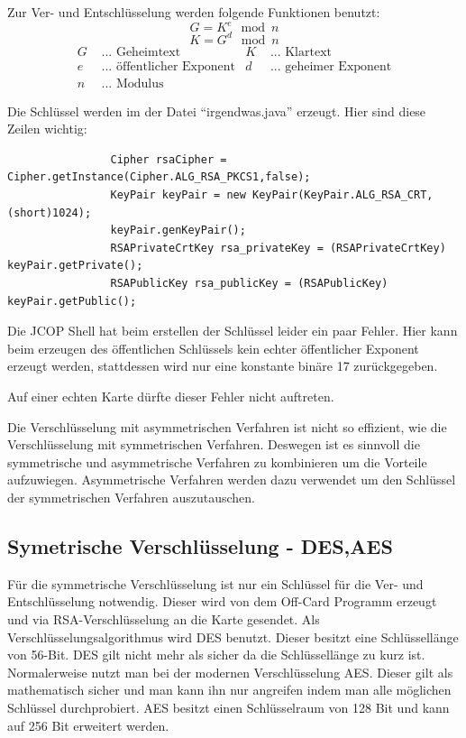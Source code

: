 \documentclass[parskip]{scrartcl}
\begin{document}
			Zur Ver- und Entschlüsselung werden folgende Funktionen benutzt:  
			 $$ G = K^{e}\mod{n} $$
			 $$ K = G^{d}\mod{n} $$
			 \begin{align*}
			  G & \text{ ... Geheimtext} & K & \text{ ... Klartext} \\
			  e & \text{ ... öffentlicher Exponent} & d & \text{ ... geheimer Exponent} \\
			  n & \text{ ... Modulus} & &
			 \end{align*}
			 
			Die Schlüssel werden im der Datei \enquote{irgendwas.java} erzeugt. Hier sind diese Zeilen wichtig:
			\label{RSAKeyPair}
			\begin{lstlisting}
				Cipher rsaCipher = Cipher.getInstance(Cipher.ALG_RSA_PKCS1,false);
				KeyPair keyPair = new KeyPair(KeyPair.ALG_RSA_CRT, (short)1024);
				keyPair.genKeyPair();
				RSAPrivateCrtKey rsa_privateKey = (RSAPrivateCrtKey) keyPair.getPrivate();
				RSAPublicKey rsa_publicKey = (RSAPublicKey) keyPair.getPublic();
			\end{lstlisting}
			Die JCOP Shell hat beim erstellen der Schlüssel leider ein paar Fehler. Hier kann beim erzeugen des öffentlichen Schlüssels kein echter öffentlicher Exponent erzeugt werden, stattdessen wird nur eine konstante binäre 17 zurückgegeben.
		
			Auf einer echten Karte dürfte dieser Fehler nicht auftreten.
		
			Die Verschlüsselung mit asymmetrischen Verfahren ist nicht so effizient, wie die Verschlüsselung mit symmetrischen Verfahren. Deswegen ist es sinnvoll die symmetrische und asymmetrische Verfahren zu kombinieren um die Vorteile aufzuwiegen. Asymmetrische Verfahren werden dazu verwendet um den Schlüssel der symmetrischen Verfahren auszutauschen.
	
		\subsection{Symetrische Verschlüsselung - DES,AES}
			Für die symmetrische Verschlüsselung ist nur ein Schlüssel für die Ver- und Entschlüs\-selung notwendig. Dieser wird von dem Off-Card Programm erzeugt und via RSA-Verschlüs\-selung an die Karte gesendet. Als Verschlüsselungsalgorithmus wird DES benutzt. Dieser besitzt eine Schlüssellänge von 56-Bit. DES gilt nicht mehr als sicher da die Schlüssellänge zu kurz ist. Normalerweise nutzt man bei der modernen Verschlüsselung AES. Dieser gilt als mathematisch sicher und man kann ihn nur angreifen indem man alle möglichen Schlüssel durchprobiert. AES besitzt einen Schlüsselraum von 128 Bit und kann auf 256 Bit erweitert werden.
			
\end{document}
